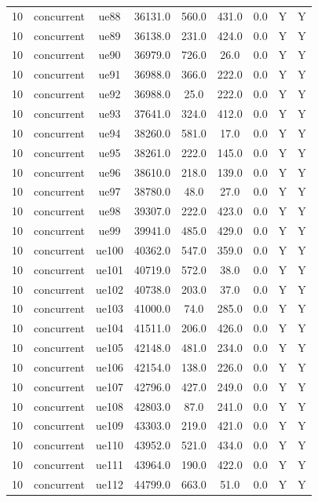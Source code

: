 \begin{table}[ht]
\begin{tabular}{|c|c|c|c|c|c|c|c|c|}
10 & concurrent & ue88 & 36131.0 & 560.0 & 431.0 & 0.0 & Y & Y \\
10 & concurrent & ue89 & 36138.0 & 231.0 & 424.0 & 0.0 & Y & Y \\
10 & concurrent & ue90 & 36979.0 & 726.0 & 26.0 & 0.0 & Y & Y \\
10 & concurrent & ue91 & 36988.0 & 366.0 & 222.0 & 0.0 & Y & Y \\
10 & concurrent & ue92 & 36988.0 & 25.0 & 222.0 & 0.0 & Y & Y \\
10 & concurrent & ue93 & 37641.0 & 324.0 & 412.0 & 0.0 & Y & Y \\
10 & concurrent & ue94 & 38260.0 & 581.0 & 17.0 & 0.0 & Y & Y \\
10 & concurrent & ue95 & 38261.0 & 222.0 & 145.0 & 0.0 & Y & Y \\
10 & concurrent & ue96 & 38610.0 & 218.0 & 139.0 & 0.0 & Y & Y \\
10 & concurrent & ue97 & 38780.0 & 48.0 & 27.0 & 0.0 & Y & Y \\
10 & concurrent & ue98 & 39307.0 & 222.0 & 423.0 & 0.0 & Y & Y \\
10 & concurrent & ue99 & 39941.0 & 485.0 & 429.0 & 0.0 & Y & Y \\
10 & concurrent & ue100 & 40362.0 & 547.0 & 359.0 & 0.0 & Y & Y \\
10 & concurrent & ue101 & 40719.0 & 572.0 & 38.0 & 0.0 & Y & Y \\
10 & concurrent & ue102 & 40738.0 & 203.0 & 37.0 & 0.0 & Y & Y \\
10 & concurrent & ue103 & 41000.0 & 74.0 & 285.0 & 0.0 & Y & Y \\
10 & concurrent & ue104 & 41511.0 & 206.0 & 426.0 & 0.0 & Y & Y \\
10 & concurrent & ue105 & 42148.0 & 481.0 & 234.0 & 0.0 & Y & Y \\
10 & concurrent & ue106 & 42154.0 & 138.0 & 226.0 & 0.0 & Y & Y \\
10 & concurrent & ue107 & 42796.0 & 427.0 & 249.0 & 0.0 & Y & Y \\
10 & concurrent & ue108 & 42803.0 & 87.0 & 241.0 & 0.0 & Y & Y \\
10 & concurrent & ue109 & 43303.0 & 219.0 & 421.0 & 0.0 & Y & Y \\
10 & concurrent & ue110 & 43952.0 & 521.0 & 434.0 & 0.0 & Y & Y \\
10 & concurrent & ue111 & 43964.0 & 190.0 & 422.0 & 0.0 & Y & Y \\
10 & concurrent & ue112 & 44799.0 & 663.0 & 51.0 & 0.0 & Y & Y \\

\end{tabular}
\end{table}
